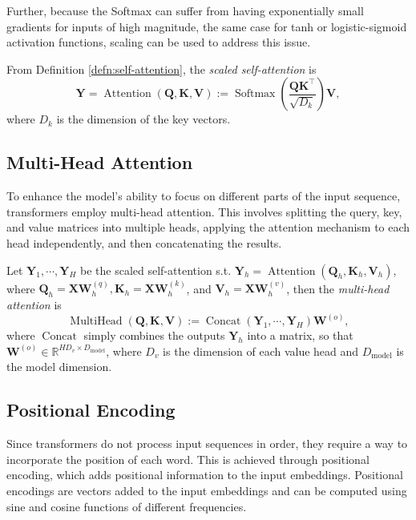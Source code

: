 Further, because the Softmax can suffer from having exponentially small gradients for inputs of high magnitude, the same case for tanh or logistic-sigmoid activation functions, scaling can be used to address this issue.

\begin{defn}
    From Definition \ref{defn:self-attention}, the \textit{scaled self-attention} is
    \begin{equation}
        \mathbf{Y}=\operatorname{Attention}(\mathbf{Q},\mathbf{K},\mathbf{V}):=\operatorname{Softmax}\left(\frac{\mathbf{Q}\mathbf{K}^{\top}}{\sqrt{D_k}}\right)\mathbf{V},
    \end{equation}
    where $D_k$ is the dimension of the key vectors.
\end{defn}

\subsection{Multi-Head Attention}
To enhance the model's ability to focus on different parts of the input sequence, transformers employ multi-head attention. This involves splitting the query, key, and value matrices into multiple heads, applying the attention mechanism to each head independently, and then concatenating the results.

\begin{defn}
    Let $\mathbf{Y}_1,\cdots,\mathbf{Y}_H$ be the scaled self-attention s.t. $\mathbf{Y}_h=\operatorname{Attention}(\mathbf{Q}_h,\mathbf{K}_h,\mathbf{V}_h)$, where $\mathbf{Q}_h=\mathbf{X}\mathbf{W}_h^{(q)},\mathbf{K}_h=\mathbf{X}\mathbf{W}_h^{(k)}$, and $\mathbf{V}_h=\mathbf{X}\mathbf{W}_h^{(v)}$, then the \textit{multi-head attention} is
    \begin{equation}
        \operatorname{MultiHead}(\mathbf{Q},\mathbf{K},\mathbf{V}):=\operatorname{Concat}(\mathbf{Y}_1,\cdots,\mathbf{Y}_H)\mathbf{W}^{(o)},
    \end{equation}
    where $\operatorname{Concat}$ simply combines the outputs $\mathbf{Y}_h$ into a matrix, so that $\mathbf{W}^{(o)}\in\mathbb{R}^{HD_v \times D_{\text{model}}}$, where $D_v$ is the dimension of each value head and $D_{\text{model}}$ is the model dimension.
\end{defn}

\subsection{Positional Encoding}
Since transformers do not process input sequences in order, they require a way to incorporate the position of each word. This is achieved through positional encoding, which adds positional information to the input embeddings. Positional encodings are vectors added to the input embeddings and can be computed using sine and cosine functions of different frequencies.

